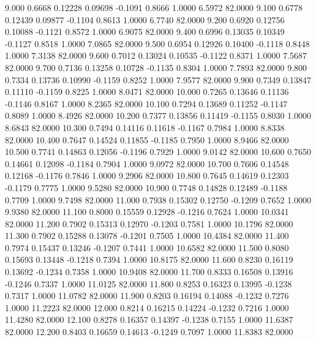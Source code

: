    9.000   0.6668   0.12228   0.09698  -0.1091   0.8666   1.0000   6.5972  82.0000
   9.100   0.6778   0.12439   0.09877  -0.1104   0.8613   1.0000   6.7740  82.0000
   9.200   0.6920   0.12756   0.10088  -0.1121   0.8572   1.0000   6.9075  82.0000
   9.400   0.6996   0.13035   0.10349  -0.1127   0.8518   1.0000   7.0865  82.0000
   9.500   0.6954   0.12926   0.10400  -0.1118   0.8448   1.0000   7.3138  82.0000
   9.600   0.7012   0.13024   0.10535  -0.1122   0.8371   1.0000   7.5687  82.0000
   9.700   0.7136   0.13258   0.10728  -0.1135   0.8304   1.0000   7.7893  82.0000
   9.800   0.7334   0.13736   0.10990  -0.1159   0.8252   1.0000   7.9577  82.0000
   9.900   0.7349   0.13847   0.11110  -0.1159   0.8225   1.0000   8.0471  82.0000
  10.000   0.7265   0.13646   0.11136  -0.1146   0.8167   1.0000   8.2365  82.0000
  10.100   0.7294   0.13689   0.11252  -0.1147   0.8089   1.0000   8.4926  82.0000
  10.200   0.7377   0.13856   0.11419  -0.1155   0.8030   1.0000   8.6843  82.0000
  10.300   0.7494   0.14116   0.11618  -0.1167   0.7984   1.0000   8.8338  82.0000
  10.400   0.7647   0.14524   0.11855  -0.1185   0.7950   1.0000   8.9466  82.0000
  10.500   0.7741   0.14863   0.12056  -0.1196   0.7929   1.0000   9.0142  82.0000
  10.600   0.7650   0.14661   0.12098  -0.1184   0.7904   1.0000   9.0972  82.0000
  10.700   0.7606   0.14548   0.12168  -0.1176   0.7846   1.0000   9.2906  82.0000
  10.800   0.7645   0.14619   0.12303  -0.1179   0.7775   1.0000   9.5280  82.0000
  10.900   0.7748   0.14828   0.12489  -0.1188   0.7709   1.0000   9.7498  82.0000
  11.000   0.7938   0.15302   0.12750  -0.1209   0.7652   1.0000   9.9380  82.0000
  11.100   0.8000   0.15559   0.12928  -0.1216   0.7624   1.0000  10.0341  82.0000
  11.200   0.7902   0.15313   0.12970  -0.1203   0.7581   1.0000  10.1796  82.0000
  11.300   0.7902   0.15288   0.13078  -0.1201   0.7505   1.0000  10.4384  82.0000
  11.400   0.7974   0.15437   0.13246  -0.1207   0.7441   1.0000  10.6582  82.0000
  11.500   0.8080   0.15693   0.13448  -0.1218   0.7394   1.0000  10.8175  82.0000
  11.600   0.8230   0.16119   0.13692  -0.1234   0.7358   1.0000  10.9408  82.0000
  11.700   0.8333   0.16508   0.13916  -0.1246   0.7337   1.0000  11.0125  82.0000
  11.800   0.8253   0.16323   0.13995  -0.1238   0.7317   1.0000  11.0782  82.0000
  11.900   0.8203   0.16194   0.14088  -0.1232   0.7276   1.0000  11.2223  82.0000
  12.000   0.8214   0.16215   0.14224  -0.1232   0.7216   1.0000  11.4280  82.0000
  12.100   0.8278   0.16357   0.14397  -0.1238   0.7155   1.0000  11.6387  82.0000
  12.200   0.8403   0.16659   0.14613  -0.1249   0.7097   1.0000  11.8383  82.0000
